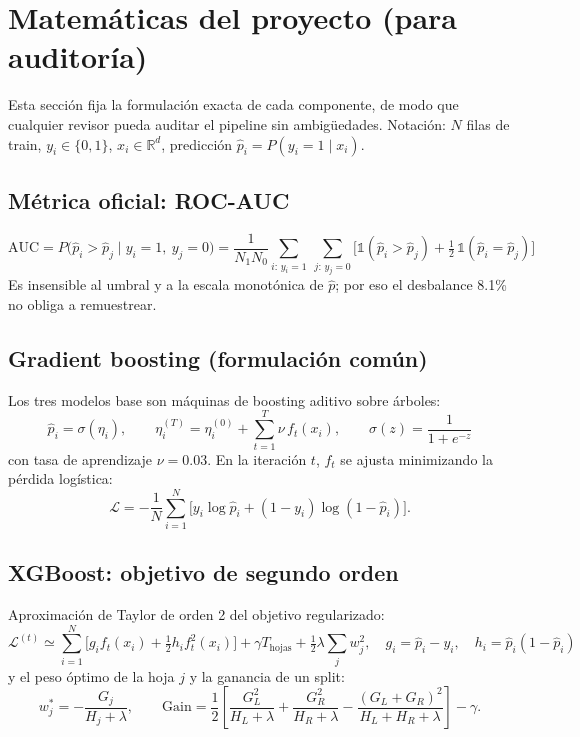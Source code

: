 \documentclass[11pt,a4paper]{article}
\begin{document}
\section{Matem\'aticas del proyecto (para auditor\'ia)}

Esta secci\'on fija la formulaci\'on exacta de cada componente, de modo que
cualquier revisor pueda auditar el pipeline sin ambig\"uedades. Notaci\'on:
$N$ filas de train, $y_i \in \{0,1\}$, $x_i \in \mathbb{R}^d$, predicci\'on
$\hat{p}_i = P(y_i=1 \mid x_i)$.

\subsection{M\'etrica oficial: ROC-AUC}
\begin{equation}
\mathrm{AUC} = P\big(\hat{p}_i > \hat{p}_j \mid y_i=1,\ y_j=0\big)
= \frac{1}{N_1 N_0} \sum_{i:\,y_i=1}\ \sum_{j:\,y_j=0}
\Big[ \mathbb{1}(\hat{p}_i > \hat{p}_j) + \tfrac{1}{2}\,\mathbb{1}(\hat{p}_i = \hat{p}_j) \Big]
\end{equation}
Es insensible al umbral y a la escala monot\'onica de $\hat{p}$; por eso el
desbalance 8.1\% no obliga a remuestrear.

\subsection{Gradient boosting (formulaci\'on com\'un)}
Los tres modelos base son m\'aquinas de boosting aditivo sobre \'arboles:
\begin{equation}
\hat{p}_i = \sigma\!\left( \eta_i \right), \qquad
\eta_i^{(T)} = \eta_i^{(0)} + \sum_{t=1}^{T} \nu\, f_t(x_i), \qquad
\sigma(z) = \frac{1}{1+e^{-z}}
\end{equation}
con tasa de aprendizaje $\nu = 0.03$. En la iteraci\'on $t$, $f_t$ se ajusta
minimizando la p\'erdida log\'istica:
\begin{equation}
\mathcal{L} = -\frac{1}{N}\sum_{i=1}^{N}
\Big[ y_i \log \hat{p}_i + (1-y_i)\log(1-\hat{p}_i) \Big].
\end{equation}

\subsection{XGBoost: objetivo de segundo orden}
Aproximaci\'on de Taylor de orden 2 del objetivo regularizado:
\begin{equation}
\mathcal{L}^{(t)} \simeq \sum_{i=1}^{N}\Big[ g_i f_t(x_i) + \tfrac{1}{2} h_i f_t^2(x_i) \Big]
+ \gamma T_{\text{hojas}} + \tfrac{1}{2}\lambda \sum_{j} w_j^2,
\quad g_i = \hat{p}_i - y_i,\quad h_i = \hat{p}_i(1-\hat{p}_i)
\end{equation}
y el peso \'optimo de la hoja $j$ y la ganancia de un split:
\begin{equation}
w_j^* = -\frac{G_j}{H_j + \lambda}, \qquad
\mathrm{Gain} = \frac{1}{2}\left[ \frac{G_L^2}{H_L+\lambda} + \frac{G_R^2}{H_R+\lambda}
- \frac{(G_L+G_R)^2}{H_L+H_R+\lambda} \right] - \gamma .
\end{equation}
\end{document}
